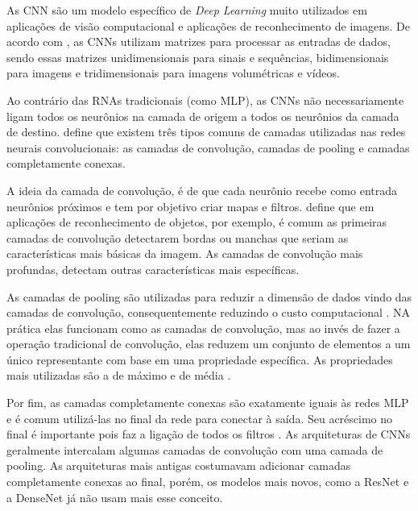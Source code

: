 As \ac{CNN} são um modelo específico de \textit{Deep Learning} muito utilizados em aplicações de visão computacional e aplicações de reconhecimento de imagens. De acordo com , as \ac{CNN}s utilizam matrizes para processar as entradas de dados, sendo essas matrizes unidimensionais para sinais e sequências, bidimensionais para imagens e tridimensionais para imagens volumétricas e vídeos. 

Ao contrário das \ac{RNA}s tradicionais (como \ac{MLP}), as \ac{CNN}s não necessariamente ligam todos os neurônios na camada de origem a todos os neurônios da camada de destino.  define que existem três tipos comuns de camadas utilizadas nas redes neurais convolucionais: as camadas de convolução, camadas de pooling e camadas completamente conexas.

A ideia da camada de convolução, é de que cada neurônio recebe como entrada neurônios próximos e tem por objetivo criar mapas e filtros.  define que em aplicações de reconhecimento de objetos, por exemplo, é comum as primeiras camadas de convolução detectarem bordas ou manchas que seriam as características mais básicas da imagem. As camadas de convolução mais profundas, detectam outras características mais específicas.

As camadas de pooling são utilizadas para reduzir a dimensão de dados vindo das camadas de convolução, consequentemente reduzindo o custo computacional \cite{ferreira-2017}. NA prática elas funcionam como as camadas de convolução, mas ao invés de fazer a operação tradicional de convolução, elas reduzem um conjunto de elementos a um único representante com base em uma propriedade específica. As propriedades mais utilizadas são a de máximo e de média \cite{ferreira-2017}.

Por fim, as camadas completamente conexas são exatamente iguais às redes MLP e é comum utilizá-las no final da rede para conectar à saída. Seu acréscimo no final é importante pois faz a ligação de todos os filtros \cite{ferreira-2017}. As arquiteturas de \ac{CNN}s geralmente intercalam algumas camadas de convolução com uma camada de pooling. As arquiteturas mais antigas costumavam adicionar camadas completamente conexas ao final, porém, os modelos mais novos, como a \ac{ResNet} e a \ac{DenseNet} já não usam mais esse conceito.





